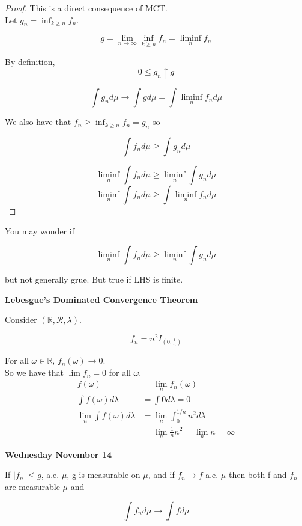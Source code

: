 \documentclass[11pt,fleqn]{book} %
\begin{document}
\begin{proof}
	This is a direct consequence of MCT. \\

	Let  $g_n = \inf_{k \geq n} f_n$. 

			$$g = \lim_{n \rightarrow \infty}\inf_{k \geq n} f_n = \liminf_n f_n $$

	By definition, 
			$$0 \leq g_n \uparrow g$$

			$$\int g_n d\mu \rightarrow \int g d\mu = \int \liminf_n f_n d\mu $$


	We also have that $f_n \geq \inf_{k \geq n} f_n = g_n$ so 

			$$\int f_n d\mu \geq \int g_n d\mu $$

			$$\liminf_n \int f_n d\mu \geq \liminf_n \int g_n d\mu $$
			$$\liminf_n \int f_n d\mu\geq \int \liminf_n f_n d\mu $$
\end{proof}

You may wonder if 
		
		$$\liminf_n \int f_n d\mu \geq \liminf_n \int g_n d\mu $$

	but not generally grue. But true if LHS is finite. 


\textbf{Lebesgue's Dominated Convergence Theorem}\\

\begin{example}
	Consider $(\mathbb{R}, \mathcal{R}, \lambda)$. 

			$$f_n = n^2 I_{(0, \frac{1}{n})} $$

	For all $\omega \in \mathbb{R}$, $f_n(\omega) \rightarrow 0 $. \\

	So we have that $\lim f_n = 0$ for all $\omega$.\\

	\begin{align*}
		f(\omega) &= \lim_n f_n(\omega)\\
		\int f(\omega) d\lambda &= \int 0 d\lambda  = 0\\
		\lim_n \int f(\omega) d\lambda &= \lim_n \int^{1/n}_0 n^2 d\lambda\\
				&=\lim_n \frac{1}{n} n^2 = \lim_n n = \infty
	\end{align*}



\end{example}

\textbf{Wednesday November 14}\\


\begin{theorem}
	If $|f_n| \leq g$, a.e. $\mu$, g is measurable on $\mu$, and if $f_n \rightarrow f$ a.e. $\mu$ then both f and $f_n$ are measurable $\mu$ and

			$$\int f_n d\mu \rightarrow \int f d\mu $$
\end{theorem}
\end{document}
